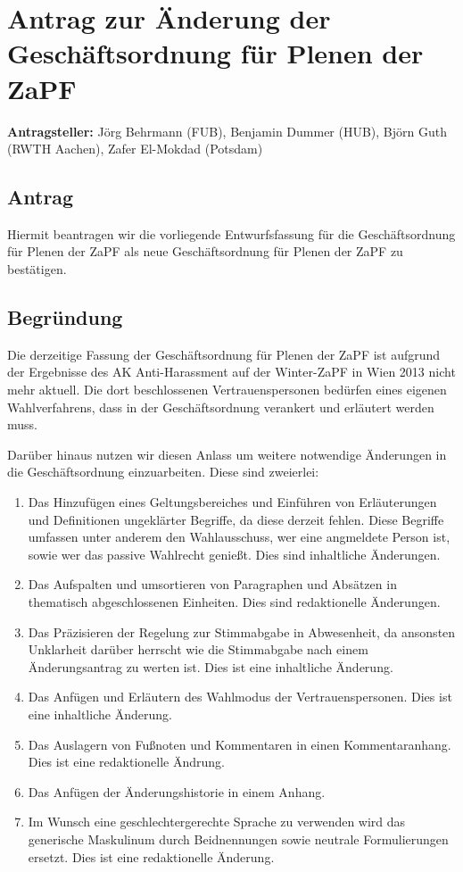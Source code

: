 \documentclass[draft,12pt,oneside]{scrartcl}
\begin{document}
\section*{Antrag zur Änderung der Geschäftsordnung für Plenen der ZaPF}

\textbf{Antragsteller:} Jörg Behrmann (FUB), Benjamin Dummer (HUB), Björn Guth (RWTH Aachen), Zafer El-Mokdad (Potsdam)

\subsection*{Antrag}

Hiermit beantragen wir die vorliegende Entwurfsfassung für die Geschäftsordnung für Plenen der ZaPF als neue
Geschäftsordnung für Plenen der ZaPF zu bestätigen.

\subsection*{Begründung}

Die derzeitige Fassung der Geschäftsordnung für Plenen der ZaPF ist aufgrund der Ergebnisse des AK Anti-Harassment auf der Winter-ZaPF in Wien
2013 nicht mehr aktuell. Die dort beschlossenen Vertrauenspersonen bedürfen eines eigenen Wahlverfahrens, dass
in der Geschäftsordnung verankert und erläutert werden muss.

Darüber hinaus nutzen wir diesen Anlass um weitere notwendige Änderungen in die Geschäftsordnung einzuarbeiten. Diese sind
zweierlei:
\begin{enumerate}
\item Das Hinzufügen eines Geltungsbereiches und Einführen von Erläuterungen und Definitionen ungeklärter Begriffe, da
      diese derzeit fehlen. Diese Begriffe umfassen unter anderem den Wahlausschuss, wer eine angmeldete Person ist,
      sowie wer das passive Wahlrecht genießt.
      Dies sind inhaltliche Änderungen.
\item Das Aufspalten und umsortieren von Paragraphen und Absätzen in thematisch abgeschlossenen Einheiten.
      Dies sind redaktionelle Änderungen.
\item Das Präzisieren der Regelung zur Stimmabgabe in Abwesenheit, da ansonsten Unklarheit darüber herrscht
      wie die Stimmabgabe nach einem Änderungsantrag zu werten ist. Dies ist eine inhaltliche Änderung.
\item Das Anfügen und Erläutern des Wahlmodus der Vertrauenspersonen. Dies ist eine inhaltliche Änderung.
\item Das Auslagern von Fußnoten und Kommentaren in einen Kommentaranhang. Dies ist eine redaktionelle Ändrung.
\item Das Anfügen der Änderungshistorie in einem Anhang.
\item Im Wunsch eine geschlechtergerechte Sprache zu verwenden wird das generische Maskulinum durch Beidnennungen
      sowie neutrale Formulierungen ersetzt. Dies ist eine redaktionelle Änderung.
\end{enumerate}
\end{document}
